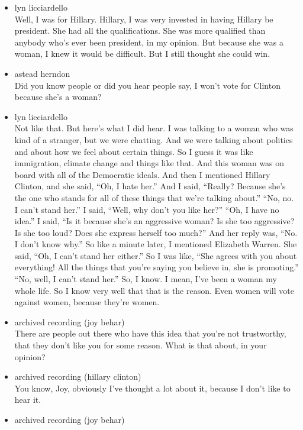 \begin{itemize}
\item
  lyn licciardello\\
  Well, I was for Hillary. Hillary, I was very invested in having
  Hillary be president. She had all the qualifications. She was more
  qualified than anybody who's ever been president, in my opinion. But
  because she was a woman, I knew it would be difficult. But I still
  thought she could win.
\item
  astead herndon\\
  Did you know people or did you hear people say, I won't vote for
  Clinton because she's a woman?
\item
  lyn licciardello\\
  Not like that. But here's what I did hear. I was talking to a woman
  who was kind of a stranger, but we were chatting. And we were talking
  about politics and about how we feel about certain things. So I guess
  it was like immigration, climate change and things like that. And this
  woman was on board with all of the Democratic ideals. And then I
  mentioned Hillary Clinton, and she said, ``Oh, I hate her.'' And I
  said, ``Really? Because she's the one who stands for all of these
  things that we're talking about.'' ``No, no. I can't stand her.'' I
  said, ``Well, why don't you like her?'' ``Oh, I have no idea.'' I
  said, ``Is it because she's an aggressive woman? Is she too
  aggressive? Is she too loud? Does she express herself too much?'' And
  her reply was, ``No. I don't know why.'' So like a minute later, I
  mentioned Elizabeth Warren. She said, ``Oh, I can't stand her
  either.'' So I was like, ``She agrees with you about everything! All
  the things that you're saying you believe in, she is promoting.''
  ``No, well, I can't stand her.'' So, I know. I mean, I've been a woman
  my whole life. So I know very well that that is the reason. Even women
  will vote against women, because they're women.
\item
  archived recording (joy behar)\\
  There are people out there who have this idea that you're not
  trustworthy, that they don't like you for some reason. What is that
  about, in your opinion?
\item
  archived recording (hillary clinton)\\
  You know, Joy, obviously I've thought a lot about it, because I don't
  like to hear it.
\item
  archived recording (joy behar)\\

\end{itemize}
